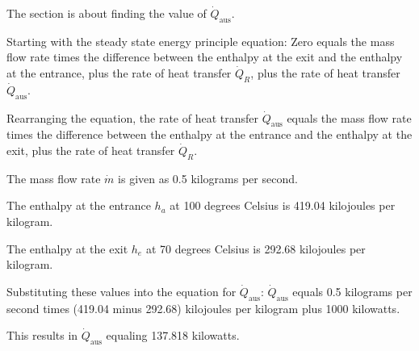 The section is about finding the value of $\dot{Q}_{\text{aus}}$.

Starting with the steady state energy principle equation:
Zero equals the mass flow rate times the difference between the enthalpy at the exit and the enthalpy at the entrance, plus the rate of heat transfer $\dot{Q}_R$, plus the rate of heat transfer $\dot{Q}_{\text{aus}}$.

Rearranging the equation, the rate of heat transfer $\dot{Q}_{\text{aus}}$ equals the mass flow rate times the difference between the enthalpy at the entrance and the enthalpy at the exit, plus the rate of heat transfer $\dot{Q}_R$.

The mass flow rate $\dot{m}$ is given as 0.5 kilograms per second.

The enthalpy at the entrance $h_a$ at 100 degrees Celsius is 419.04 kilojoules per kilogram.

The enthalpy at the exit $h_e$ at 70 degrees Celsius is 292.68 kilojoules per kilogram.

Substituting these values into the equation for $\dot{Q}_{\text{aus}}$:
$\dot{Q}_{\text{aus}}$ equals 0.5 kilograms per second times (419.04 minus 292.68) kilojoules per kilogram plus 1000 kilowatts.

This results in $\dot{Q}_{\text{aus}}$ equaling 137.818 kilowatts.